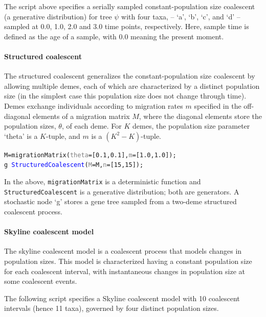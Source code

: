 \documentclass[10pt,letterpaper,table]{article}
\theoremstyle{definition}
\begin{document}
The script above specifies a serially sampled constant-population size coalescent (a generative distribution) for tree $\psi$ with four taxa, -- `a', `b', `c', and `d' -- sampled at 0.0, 1.0, 2.0 and 3.0 time points, respectively. Here, sample time is defined as the age of a sample, with 0.0 meaning the present moment.

\paragraph{Structured coalescent}
The structured coalescent \cite{hudson1990oxford, notohara1990coalescent} generalizes the constant-population size coalescent \cite{kingman82} by allowing multiple demes, each of which are characterized by a distinct population size (in the simplest case this population size does not change through time).
Demes exchange individuals according to migration rates $m$ specified in the off-diagonal elements of a migration matrix $M$, where the diagonal elements store the population sizes, $\theta$, of each deme.
For $K$ demes, the population size parameter `theta' is a $K$-tuple, and $m$ is a $(K^2-K)$-tuple.

{\small
  \begin{alltt}
    M = \textcolor{generator}{migrationMatrix}(\textcolor{gray}{theta}=[\textcolor{constant}{0.1}, \textcolor{constant}{0.1}], \textcolor{gray}{m}=[\textcolor{constant}{1.0}, \textcolor{constant}{1.0}]);
    \textcolor{bluishgreen}{g} ~ \textcolor{blue}{StructuredCoalescent}(\textcolor{gray}{M}=M, \textcolor{gray}{n}=[\textcolor{constant}{15}, \textcolor{constant}{15}]);
  \end{alltt}
}

In the above, \texttt{migrationMatrix} is a deterministic function and \texttt{StructuredCoalescent} is a generative distribution; both are generators. A stochastic node `g' stores a gene tree sampled from a two-deme structured coalescent process.

\paragraph{Skyline coalescent model}
The skyline coalescent model \cite{drummond2005bayesian} is a coalescent process that models changes in population sizes.
This model is characterized having a constant population size for each coalescent interval, with instantaneous changes in population size at some coalescent events.

The following script specifies a Skyline coalescent model with 10 coalescent intervals (hence 11 taxa), governed by four distinct population sizes.
\end{document}
